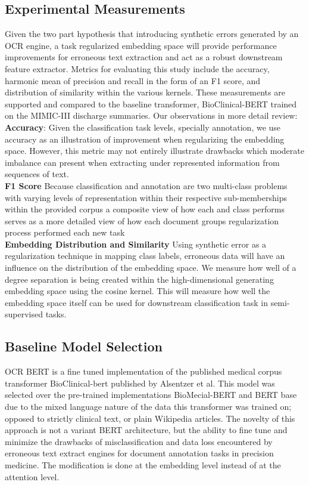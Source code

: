 \documentclass{article}
\begin{document}
    \subsection{Experimental Measurements}
    Given the two part hypothesis that introducing synthetic errors generated by an OCR engine, a task regularized embedding space will provide performance improvements for erroneous text extraction and act as a robust downstream feature extractor. Metrics for evaluating this study include the accuracy, harmonic mean of precision and recall in the form of an F1 score, and distribution of similarity within the various kernels. These measurements are supported and compared to the baseline transformer, BioClinical-BERT trained on the MIMIC-III discharge summaries. Our observations in more detail review: \\
        \textbf{Accuracy}: Given the classification task levels, specially annotation, we use accuracy as an illustration of improvement when regularizing the embedding space. However, this metric may not entirely illustrate drawbacks which moderate imbalance can present when extracting under represented information from sequences of text. \\
        \textbf{F1 Score} Because classification and annotation are two multi-class problems with varying levels of representation within their respective sub-memberships within the provided corpus a composite view of how each and class performs serves as a more detailed view of how each document groups regularization process performed each new task \\
        \textbf{Embedding Distribution and Similarity} Using synthetic error as a regularization technique in mapping class labels, erroneous data will have an influence on the distribution of the embedding space. We measure how well of a degree separation is being created within the high-dimensional generating embedding space using the cosine kernel. This will measure how well the embedding space itself can be used for downstream classification task in semi-supervised tasks. 
    
    \subsection{Baseline Model Selection}
    OCR BERT is a fine tuned implementation of the published medical corpus transformer BioClinical-bert published by Alsentzer et al. This model was selected over the pre-trained implementations BioMecial-BERT and BERT base due to the mixed language nature of the data this transformer was trained on; opposed to strictly clinical text, or plain Wikipedia articles. The novelty of this approach is not a variant BERT architecture, but the ability to fine tune and minimize the drawbacks of misclassification and data loss encountered by erroneous text extract engines for document annotation tasks in precision medicine. The modification is done at the embedding level instead of at the attention level.
\end{document}

